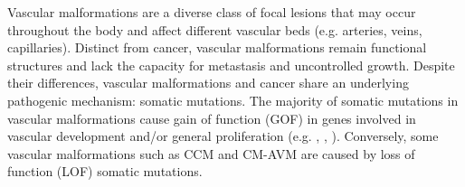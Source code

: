 \abstract

Vascular malformations are a diverse class of focal lesions that may occur throughout the body and affect different vascular beds (e.g. arteries, veins, capillaries). Distinct from cancer, vascular malformations remain functional structures and lack the capacity for metastasis and uncontrolled growth. Despite their differences, vascular malformations and cancer share an underlying pathogenic mechanism: somatic mutations. The majority of somatic mutations in vascular malformations cause gain of function (GOF) in genes involved in vascular development and/or general proliferation (e.g. , , ). Conversely, some vascular malformations such as CCM and CM-AVM are caused by loss of function (LOF) somatic mutations. 
